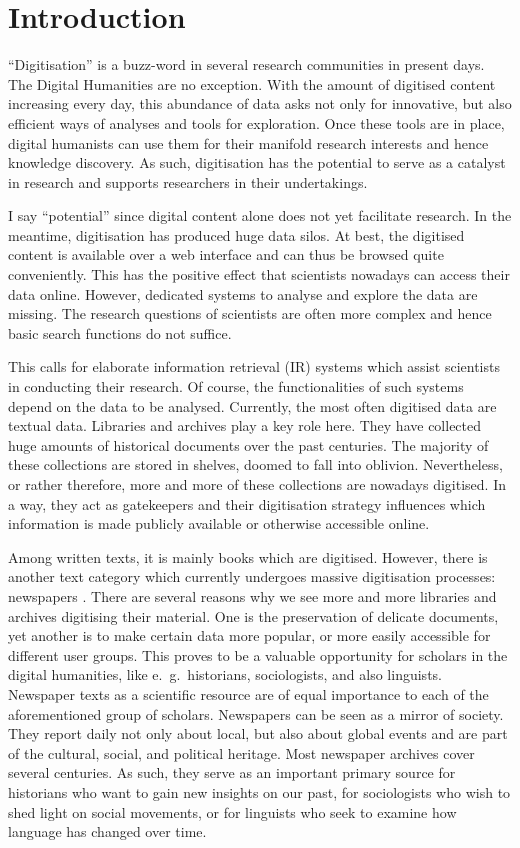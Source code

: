 \section{Introduction}
``Digitisation'' is a buzz-word in several research communities in present days. The Digital Humanities are no exception. With the amount of digitised content increasing every day, this abundance of data asks not only for innovative, but also efficient ways of analyses and tools for exploration. Once these tools are in place, digital humanists can use them for their manifold research interests and hence knowledge discovery. As such, digitisation has the potential to serve as a catalyst in research and supports researchers in their undertakings.

I say ``potential'' since digital content alone does not yet facilitate research. In the meantime, digitisation has produced huge data silos. At best, the digitised content is available over a web interface and can thus be browsed quite conveniently. This has the positive effect that scientists nowadays can access their data online. However, dedicated systems to analyse and explore the data are missing. The research questions of scientists are often more complex and hence basic search functions do not suffice.

This calls for elaborate information retrieval (IR) systems which assist scientists in conducting their research. Of course, the functionalities of such systems depend on the data to be analysed. Currently, the most often digitised data are textual data. Libraries and archives play a key role here. They have collected huge amounts of historical documents over the past centuries. The majority of these collections are stored in shelves, doomed to fall into oblivion. Nevertheless, or rather therefore, more and more of these collections are nowadays digitised. In a way, they act as gatekeepers and their digitisation strategy influences which information is made publicly available or otherwise accessible online.  

Among written texts, it is mainly books which are digitised. However, there is another text category which currently undergoes massive digitisation processes: newspapers \citep{lansdall-welfarecontent2017,prestondigital2016,binghamdigitization2010}. There are several reasons why we see more and more libraries and archives digitising their material. One is the preservation of delicate documents, yet another is to make certain data more popular, or more easily accessible for different user groups. This proves to be a valuable opportunity for scholars in the digital humanities, like e.~g.~historians, sociologists, and also linguists. Newspaper texts as a scientific resource are of equal importance to each of the aforementioned group of scholars. Newspapers can be seen as a mirror of society. They report daily not only about local, but also about global events and are part of the cultural, social, and political heritage. Most newspaper archives cover several centuries. As such, they serve as an important primary source for historians who want to gain new insights on our past, for sociologists who wish to shed light on social movements, or for linguists who seek to examine how language has changed over time.

